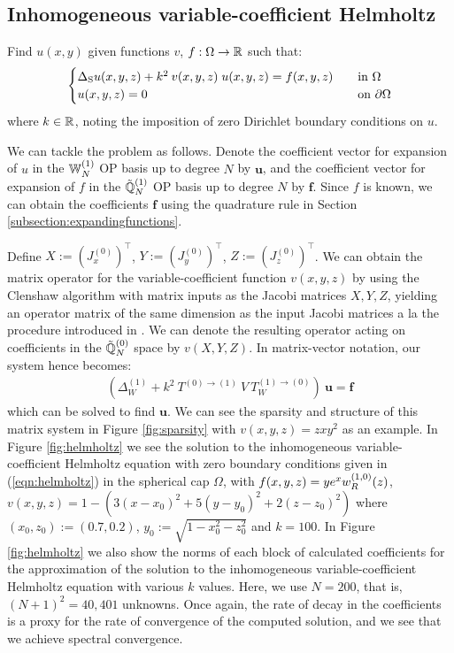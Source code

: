 \documentclass[11pt, oneside]{article}   	%
\begin{document}
\subsection{Inhomogeneous variable-coefficient Helmholtz}

Find $u(x,y)$ given functions $v$, $f : \Omega \to \mathbb{R}$ such that:
\begin{align}
	\begin{cases}
    		\Delta_{\rm S} u(x,y,z) + k^2 \: v(x,y,z) \; u(x,y,z) = f(x,y,z) &\quad \text{in } \Omega \\
		u(x,y,z) = 0 &\quad \text{on } \partial \Omega
	\end{cases}
	\label{eqn:helmholtz}
\end{align}
where $k \in \mathbb{R}$, noting the imposition of zero Dirichlet boundary conditions on $u$.

We can tackle the problem as follows. Denote the coefficient vector for expansion of $u$ in the $\mathbb{W}_N^{(1)}$ OP basis up to degree $N$ by $\mathbf{u}$, and the coefficient vector for expansion of $f$ in the ${\mathbb{\tilde Q}}^{(1)}_{N}$ OP basis up to degree $N$ by $\mathbf{f}$. Since $f$ is known, we can obtain  the coefficients $\mathbf{f}$ using the quadrature rule in Section \ref{subsection:expandingfunctions}. 

Define $X := (J_x^{(0)})^\top$, $Y := (J_y^{(0)})^\top$, $Z := (J_z^{(0)})^\top$. We can obtain the matrix operator for the variable-coefficient function $v(x,y,z)$ by using the Clenshaw algorithm with matrix inputs as the Jacobi matrices $X, Y, Z$, yielding an operator matrix of the same dimension as the input Jacobi matrices a la the procedure introduced in \cite{olver2019triangle}. We can denote the resulting operator acting on coefficients in the ${\mathbb{\tilde Q}}^{(0)}_{N}$ space by $v(X, Y, Z)$. In matrix-vector notation, our system hence becomes:
\begin{align*}
    (\Delta_W^{(1)} + k^2 \:T^{(0)\to(1)} \: V \: T_W^{(1)\to(0)}) \: \mathbf{u} = \mathbf{f}
\end{align*}
which can be solved to find $\mathbf{u}$. We can see the sparsity and structure of this matrix system in Figure \ref{fig:sparsity} with $v(x,y,z) = zxy^2$ as an example. In Figure \ref{fig:helmholtz} we see the solution to the inhomogeneous variable-coefficient Helmholtz equation with zero boundary conditions given in (\ref{eqn:helmholtz}) in the spherical cap $\Omega$, with $f(x,y,z) = y e^x w_R^{(1,0)}(z)$, $v(x,y,z) = 1 - (3(x-x_0)^2 + 5(y-y_0)^2 + 2(z-z_0)^2)$ where $(x_0, z_0) := (0.7, 0.2)$, $y_0 := \sqrt{1 - x_0^2 - z_0^2}$ and $k = 100$. In Figure \ref{fig:helmholtz} we also show the norms of each block of calculated coefficients for the approximation of the solution to the inhomogeneous variable-coefficient Helmholtz equation with various $k$ values. Here, we use $N = 200$, that is, $(N+1)^2 = 40,401$ unknowns. Once again, the rate of decay in the coefficients is a proxy for the rate of convergence of the computed solution, and we see that we achieve spectral convergence.
\end{document}
